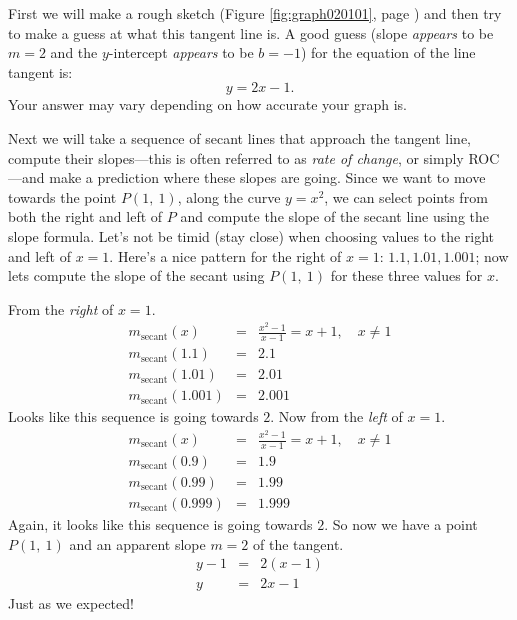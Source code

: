 \documentclass[12pt,addpoints, answers, fleqn]{exam}
\begin{document}
\begin{solution}
First we will make a rough sketch (Figure \ref{fig:graph020101}, page \pageref{fig:graph020101}) and then try to make a guess at what this tangent line is. A good guess (slope \emph{appears} to be $m=2$ and the $y$-intercept \emph{appears} to be $b =-1$) for the equation of the line tangent is:
\[
y = 2x -1.
\]
Your answer may vary depending on how accurate your graph is.

Next we will take a sequence of secant lines that approach the tangent line, compute their slopes---this is often referred to as \emph{rate of change}, or simply ROC---and make a prediction where these slopes are going. Since we want to move towards the point $P\left( 1, \ 1 \right)$, along the curve $y = x^2$, we can select points from both the right and left of $P$ and compute the slope of the secant line using the slope formula. Let's not be timid (stay close) when choosing values to the right and left of $x=1$. Here's a nice pattern for the right of $x=1$: $1.1, 1.01, 1.001$; now lets compute the slope of the secant using $P\left( 1, \ 1 \right)$ for these three values for $x$.

From the \emph{right} of $x=1$.
\begin{eqnarray*}
m_{\mbox{secant}} \left( x \right) &=& \frac{x^2-1}{x-1} = x+1, \quad x \neq 1\\
m_{\mbox{secant}} \left( 1.1 \right) &=& 2.1\\
m_{\mbox{secant}} \left( 1.01 \right) &=& 2.01\\
m_{\mbox{secant}} \left( 1.001 \right) &=& 2.001
\end{eqnarray*}
Looks like this sequence is going towards $2$. Now from the \emph{left} of $x=1$.
\begin{eqnarray*}
m_{\mbox{secant}} \left( x \right) &=& \frac{x^2-1}{x-1} = x+1, \quad x \neq 1\\
m_{\mbox{secant}} \left( 0.9 \right) &=& 1.9\\
m_{\mbox{secant}} \left( 0.99 \right) &=& 1.99\\
m_{\mbox{secant}} \left( 0.999 \right) &=& 1.999
\end{eqnarray*}
Again, it looks like this sequence is going towards $2$. So now we have a point $P\left( 1, \ 1 \right)$ and an apparent slope $m=2$ of the tangent.
\begin{eqnarray*}
y - 1 &=& 2 \left( x -1 \right)\\
y  &=& 2x -1 
\end{eqnarray*}
Just as we expected!
\end{solution}
\end{document}
